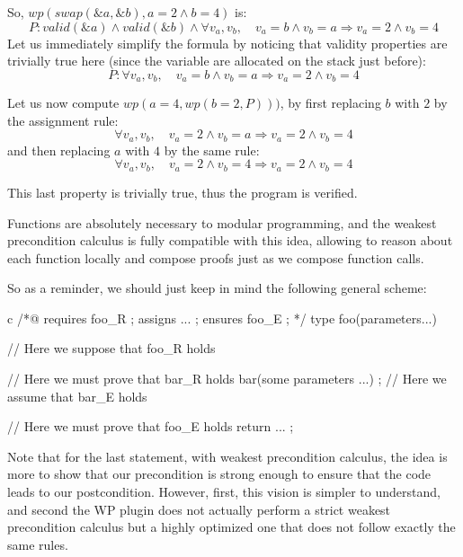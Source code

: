 So, $wp(swap(\&a, \&b), a = 2 \wedge b = 4)$ is:
$$P: valid(\&a) \wedge valid(\&b) \wedge \forall v_a, v_b, \quad v_a = b \wedge v_b = a \Rightarrow v_a = 2 \wedge v_b = 4$$
Let us immediately simplify the formula by noticing that validity properties
are trivially true here (since the variable are allocated on the stack just
before):
$$P: \forall v_a, v_b, \quad v_a = b \wedge v_b = a \Rightarrow v_a = 2 \wedge v_b = 4$$


Let us now compute $wp(a = 4, wp(b = 2, P)))$, by first replacing $b$ with
$2$ by the assignment rule:
$$\forall v_a, v_b, \quad v_a = 2 \wedge v_b = a \Rightarrow v_a = 2 \wedge v_b = 4$$
and then replacing $a$ with $4$ by the same rule:
$$\forall v_a, v_b, \quad v_a = 2 \wedge v_b = 4 \Rightarrow v_a = 2 \wedge v_b = 4$$


This last property is trivially true, thus the program is verified.






Functions are absolutely necessary to modular programming, and the weakest
precondition calculus is fully compatible with this idea, allowing to reason
about each function locally and compose proofs just as we compose function
calls.


So as a reminder, we should just keep in mind the following general scheme:



\begin{CodeBlock}{c}
/*@
  requires foo_R ;
  assigns ... ;
  ensures foo_E ;
*/
type foo(parameters...){
  // Here we suppose that foo_R holds


  // Here we must prove that bar_R holds
  bar(some parameters ...) ;
  // Here we assume that bar_E holds


  // Here we must prove that foo_E holds
  return ... ;
}
\end{CodeBlock}


Note that for the last statement, with weakest precondition calculus, the idea
is more to show that our precondition is strong enough to ensure that the code
leads to our postcondition. However, first, this vision is simpler to
understand, and second the WP plugin does not actually perform a strict weakest
precondition calculus but a highly optimized one that does not follow exactly
the same rules.




